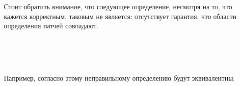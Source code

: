 Стоит обратить внимание, что следующее определение, несмотря на то,
что кажется корректным, таковым не является: отсутствует гарантия, что
области определения патчей совпадают.

\begin{code}%
\> \AgdaSymbol{:}  \AgdaSymbol{\{}  \AgdaSymbol{:} \AgdaSymbol{\}} \<[27]%
\>[27]\<%
\\
\>[0]\<[2]%
\>[2] \AgdaSymbol{(} \AgdaSymbol{:}  \AgdaSymbol{)}  \AgdaSymbol{(} \AgdaSymbol{:}  \AgdaSymbol{)}  \<%
\\
\>   \AgdaSymbol{=}  \AgdaSymbol{(} \AgdaSymbol{:} \AgdaSymbol{)}  \AgdaSymbol{(} \AgdaSymbol{:}   \AgdaSymbol{)}  \AgdaSymbol{(} \AgdaSymbol{:}   \AgdaSymbol{)} \<[63]%
\>[63]\<%
\\
\>[0]\<[2]%
\>[2]         \<%
\end{code}

Например, согласно этому неправильному определению будут эквивалентны:

\begin{code}%
\> \AgdaSymbol{:}  \AgdaSymbol{\{}   \AgdaSymbol{\}}                \<%
\\
\>   \AgdaSymbol{(}  \AgdaSymbol{\_)} \AgdaSymbol{(}  \AgdaSymbol{\_)} \AgdaSymbol{=}  \AgdaSymbol{(} \AgdaSymbol{)}\<%
\end{code}

